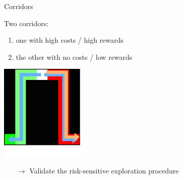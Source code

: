 \documentclass[slideopt,A4,showboxes,svgnames]{beamer}
\begin{document}
\begin{frame}{Corridors}

Two corridors:
\begin{enumerate}
\item one with {\red high costs / high rewards}
\item the other with {\green no costs / low rewards}
\end{enumerate}

\begin{center}
	\includegraphics[width=0.3\textwidth]{../../source/img/corridors_paths}
\end{center}

\begin{itemize}
	\item[$\rightarrow$] Validate the \alert{risk-sensitive exploration} procedure
\end{itemize}

\end{frame}
\end{document}
